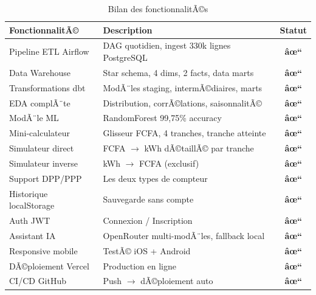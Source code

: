 \documentclass[12pt,a4paper]{report}
\begin{document}
\begin{table}[h!]
\centering
\caption{Bilan des fonctionnalitÃ©s}
\label{tab:fonctionnalites}
\begin{tabularx}{\textwidth}{l X c}
\toprule
\rowcolor{marine!10}
FonctionnalitÃ© & Description & Statut \\
\midrule
Pipeline ETL Airflow   & DAG quotidien, ingest 330k lignes PostgreSQL & \textcolor{green!60!black}{\textbf{âœ“}} \\
Data Warehouse         & Star schema, 4 dims, 2 facts, data marts     & \textcolor{green!60!black}{\textbf{âœ“}} \\
Transformations dbt    & ModÃ¨les staging, intermÃ©diaires, marts        & \textcolor{green!60!black}{\textbf{âœ“}} \\
EDA complÃ¨te           & Distribution, corrÃ©lations, saisonnalitÃ©     & \textcolor{green!60!black}{\textbf{âœ“}} \\
ModÃ¨le ML              & RandomForest 99,75\% accuracy                & \textcolor{green!60!black}{\textbf{âœ“}} \\
Mini-calculateur       & Glisseur FCFA, 4 tranches, tranche atteinte & \textcolor{green!60!black}{\textbf{âœ“}} \\
Simulateur direct      & FCFA $\rightarrow$ kWh dÃ©taillÃ© par tranche & \textcolor{green!60!black}{\textbf{âœ“}} \\
Simulateur inverse     & kWh $\rightarrow$ FCFA (exclusif)            & \textcolor{green!60!black}{\textbf{âœ“}} \\
Support DPP/PPP        & Les deux types de compteur                  & \textcolor{green!60!black}{\textbf{âœ“}} \\
Historique localStorage & Sauvegarde sans compte                     & \textcolor{green!60!black}{\textbf{âœ“}} \\
Auth JWT               & Connexion / Inscription                     & \textcolor{green!60!black}{\textbf{âœ“}} \\
Assistant IA           & OpenRouter multi-modÃ¨les, fallback local    & \textcolor{green!60!black}{\textbf{âœ“}} \\
Responsive mobile      & TestÃ© iOS + Android                         & \textcolor{green!60!black}{\textbf{âœ“}} \\
DÃ©ploiement Vercel     & Production en ligne                         & \textcolor{green!60!black}{\textbf{âœ“}} \\
CI/CD GitHub           & Push $\rightarrow$ dÃ©ploiement auto         & \textcolor{green!60!black}{\textbf{âœ“}} \\
\bottomrule
\end{tabularx}
\end{table}
\end{document}

